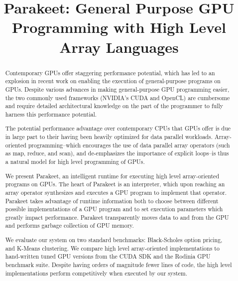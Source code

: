 \documentclass[preprint]{sigplanconf}
\begin{document}


\title{Parakeet: General Purpose GPU Programming with High Level Array
Languages}

\maketitle

\begin{abstract}
Contemporary GPUs offer staggering performance potential, which has
led to an explosion in recent work on enabling the execution of
general-purpose programs on GPUs. Despite various advances in making
general-purpose GPU programming easier, the two commonly used
frameworks (NVIDIA's CUDA and OpenCL) are cumbersome and require
detailed architectural knowledge on the part of the programmer to
fully harness this performance potential.

The potential performance advantage over contemporary CPUs that GPUs
offer is due in large part to their having been heavily optimized for
data parallel workloads.  Array-oriented programming--which encourages
the use of data parallel array operators (such as map, reduce, and
scan), and de-emphasizes the importance of explicit loops--is thus a
natural model for high level programming of GPUs.

We present Parakeet, an intelligent runtime for executing high level
array-oriented programs on GPUs.  The heart of Parakeet is an
interpreter, which upon reaching an array operator synthesizes and
executes a GPU program to implement that operator. Parakeet takes
advantage of runtime information both to choose between different
possible implementations of a GPU program and to set execution
parameters which greatly impact performance. Parakeet transparently
moves data to and from the GPU and performs garbage collection of GPU
memory.

We evaluate our system on two standard benchmarks: Black-Scholes
option pricing, and K-Means clustering.  We compare high level
array-oriented implementations to hand-written tuned GPU versions from
the CUDA SDK and the Rodinia GPU benchmark suite. Despite having
orders of magnitude fewer lines of code, the high level
implementations perform competitively when executed by our system.
\end{abstract}
\end{document}
